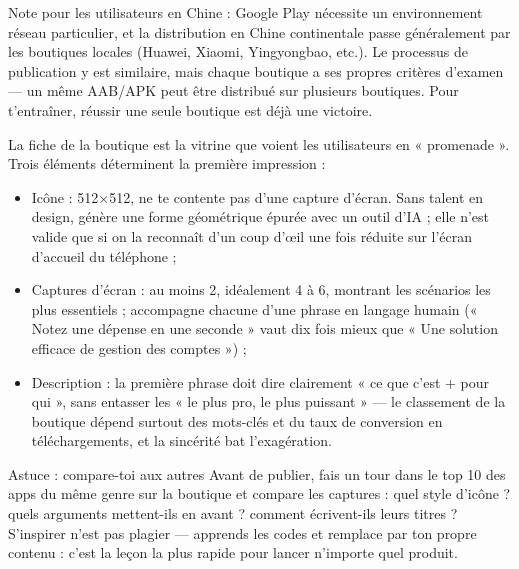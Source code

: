 Note pour les utilisateurs en Chine : Google Play nécessite un environnement réseau particulier, et la distribution en Chine continentale passe généralement par les boutiques locales (Huawei, Xiaomi, Yingyongbao, etc.). Le processus de publication y est similaire, mais chaque boutique a ses propres critères d’examen — un même AAB/APK peut être distribué sur plusieurs boutiques. Pour t’entraîner, réussir une seule boutique est déjà une victoire.


La fiche de la boutique est la vitrine que voient les utilisateurs en « promenade ». Trois éléments déterminent la première impression :

\begin{itemize}
  \item Icône : 512×512, ne te contente pas d’une capture d’écran. Sans talent en design, génère une forme géométrique épurée avec un outil d’IA ; elle n’est valide que si on la reconnaît d’un coup d’œil une fois réduite sur l’écran d’accueil du téléphone ;
  \item Captures d’écran : au moins 2, idéalement 4 à 6, montrant les scénarios les plus essentiels ; accompagne chacune d’une phrase en langage humain (« Notez une dépense en une seconde » vaut dix fois mieux que « Une solution efficace de gestion des comptes ») ;
  \item Description : la première phrase doit dire clairement « ce que c’est + pour qui », sans entasser les « le plus pro, le plus puissant » — le classement de la boutique dépend surtout des mots-clés et du taux de conversion en téléchargements, et la sincérité bat l’exagération.
\end{itemize}

\begin{tcbinfo}{Astuce : compare-toi aux autres}
Avant de publier, fais un tour dans le top 10 des apps du même genre sur la boutique et compare les captures : quel style d’icône ? quels arguments mettent-ils en avant ? comment écrivent-ils leurs titres ? S’inspirer n’est pas plagier — apprends les codes et remplace par ton propre contenu : c’est la leçon la plus rapide pour lancer n’importe quel produit.

\end{tcbinfo}



